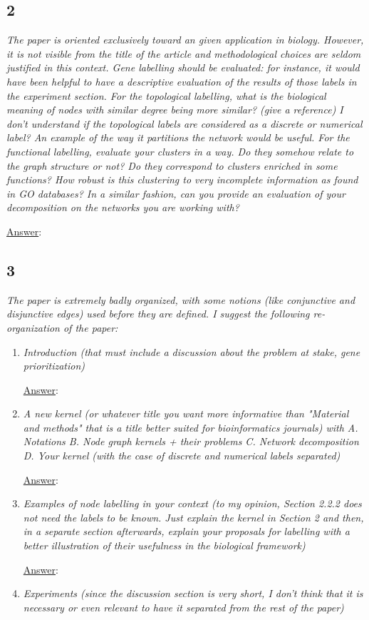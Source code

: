 \documentclass[11pt]{article}
\begin{document}
\subsection*{2} \textit{The paper is oriented exclusively toward an given application in biology. However, it is not visible from the title of the article and methodological choices are seldom justified in this context. Gene labelling should be evaluated: for instance, it would have been helpful to have a descriptive evaluation of the results of those labels in the experiment section. For the topological labelling, what is the biological meaning of nodes with similar degree being more similar? (give a reference) I don't understand if the topological labels are considered as a discrete or numerical label? An example of the way it partitions the network would be useful. For the functional labelling, evaluate your clusters in a way. Do they somehow relate to the graph structure or not? Do they correspond to clusters enriched in some functions? How robust is this clustering to very incomplete information as found in GO databases? In a similar fashion, can you provide an evaluation of your
decomposition on the networks you are working with?}

\underline{Answer}: 

\subsection*{3} \textit{The paper is extremely badly organized, with some notions (like conjunctive and disjunctive edges) used before they are defined. I suggest the following re-organization of the paper:}

\begin{enumerate}
\item \textit{Introduction (that must include a discussion about the problem at stake, gene prioritization)}

\underline{Answer}: 

\item \textit{A new kernel (or whatever title you want more informative than "Material and methods" that is a title better suited for bioinformatics journals) with A. Notations B. Node graph kernels + their problems C. Network decomposition D. Your kernel (with the case of discrete and numerical labels separated)}

\underline{Answer}: 

\item \textit{Examples of node labelling in your context (to my opinion, Section 2.2.2 does not need the labels to be known. Just explain the kernel in Section 2 and then, in a separate section afterwards, explain your proposals for labelling with a better illustration of their usefulness in the biological framework)}

\underline{Answer}: 

\item \textit{Experiments (since the discussion section is very short, I don't think that it is necessary or even relevant to have it separated from the rest of the paper)}
\end{enumerate}
\end{document}
